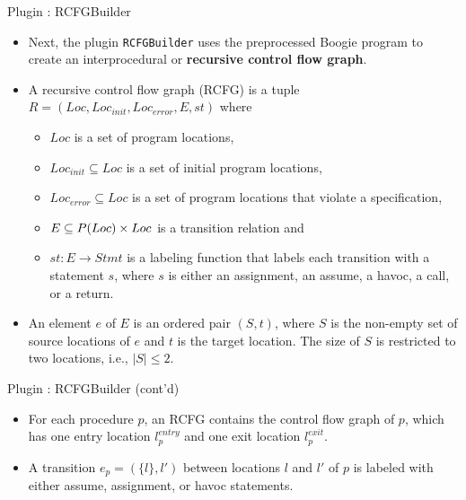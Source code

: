\documentclass[12pt]{beamer}
\newcommand{\code}[1]{\texttt{#1}}
\begin{document}
\begin{frame}{Plugin : RCFGBuilder}
	\begin{itemize}
		\item Next, the plugin \code{RCFGBuilder} uses the preprocessed Boogie program to create an interprocedural or \textbf{recursive control flow graph}.
		\item A recursive control flow graph (RCFG) is a tuple $R = (Loc, Loc_{init}, Loc_{error}, E, st)$ where
		\begin{itemize}
			\item $Loc$ is a set of program locations,
			\item $Loc_{init} \subseteq Loc$ is a set of initial program locations,
			\item $Loc_{error} \subseteq Loc$ is a set of program locations that violate a specification,
			\item $E \subseteq \mathnormal{P}(Loc) \times Loc$ is a transition relation and
			\item $st : E \to Stmt$  is a labeling function that labels each transition with a statement $s$, where $s$ is either an assignment, an assume, a havoc, a call, or a return.
		\end{itemize}
		\item An element $e$ of $E$ is an ordered pair $(S, t)$, where $S$ is the non-empty set of source locations of $e$ and $t$ is the target location. The size of $S$ is restricted to two locations, i.e., $|S| \leq 2$.
	\end{itemize}
\end{frame}

\begin{frame}{Plugin : RCFGBuilder (cont'd)}
	\begin{itemize}
		\item For each procedure $p$, an RCFG contains the control flow graph of $p$, which has one entry location $l^{entry}_{p}$ and one exit location $l^{exit}_{p}$.
		\item A transition $e_{p} = (\{l\}, l')$ between locations $l$ and $l'$ of $p$ is labeled with either assume, assignment, or havoc statements.
	\end{itemize}
\end{frame}
\end{document}
